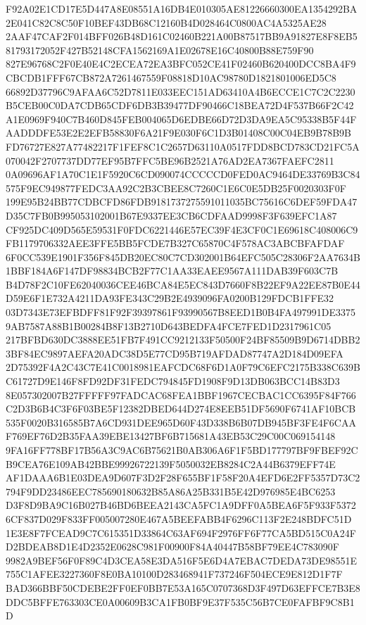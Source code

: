 \documentclass[UTF8,fontset=fandol,zihao=-4,a4paper]{ctexart}
\begin{document}
{{F92A02E1CD17E5D447A8E08551A16DB4E010305AE81226660300EA1354292BA2E041C82C8C50F10BEF43DB68C12160B4D028464C0800AC4A5325AE28
2AAF47CAF2F014BFF026B48D161C02460B221A00B87517BB9A91827E8F8EB581793172052F427B52148CFA1562169A1E02678E16C40800B88E759F90
827E96768C2F0E40E4C2ECEA72EA3BFC052CE41F02460B620400DCC8BA4F9CBCDB1FFF67CB872A7261467559F08818D10AC98780D1821801006ED5C8
66892D37796C9AFAA6C52D7811E033EEC151AD63410A4B6ECCE1C7C2C2230B5CEB00C0DA7CDB65CDF6DB3B39477DF90466C18BEA72D4F537B66F2C42
A1E0969F940C7B460D845FEB004065D6EDBE66D72D3DA9EA5C95338B5F44FAADDDFE53E2E2EFB58830F6A21F9E030F6C1D3B01408C00C04EB9B78B9B
FD76727E827A77482217F1FEF8C1C2657D63110A0517FDD8BCD783CD21FC5A070042F2707737DD77EF95B7FFC5BE96B2521A76AD2EA7367FAEFC2811
0A09696AF1A70C1E1F5920C6CD090074CCCCCD0FED0AC9464DE33769B3C84575F9EC949877FEDC3AA92C2B3CBEE8C7260C1E6C0E5DB25F0020303F0F
199E95B24BB77CDBCFD86FDB9181737275591011035BC75616C6DEF59FDA47D35C7FB0B995053102001B67E9337EE3CB6CDFAAD9998F3F639EFC1A87
CF925DC409D565E59531F0FDC6221446E57EC39F4E3CF0C1E69618C408006C9FB1179706332AEE3FFE5BB5FCDE7B327C65870C4F578AC3ABCBFAFDAF
6F0CC539E1901F356F845DB20EC80C7CD302001B64EFC505C28306F2AA7634B1BBF184A6F147DF98834BCB2F77C1AA33EAEE9567A111DAB39F603C7B
B4D78F2C10FE62040036CEE46BCA84E5EC843D7660F8B22EF9A22EE87B0E44D59E6F1E732A4211DA93FE343C29B2E4939096FA0200B129FDCB1FFE32
03D7343E73EFBDFF81F92F39397861F93990567B8EED1B0B4FA497991DE33759AB7587A88B1B00284B8F13B2710D643BEDFA4FCE7FED1D2317961C05
217BFBD630DC3888EE51FB7F491CC9212133F50500F24BF85509B9D6714DBB23BF84EC9897AEFA20ADC38D5E77CD95B719AFDAD87747A2D184D09EFA
2D75392F4A2C43C7E41C0018981EAFCDC68F6D1A0F79C6EFC2175B338C639BC61727D9E146F8FD92DF31FEDC794845FD1908F9D13DB063BCC14B83D3
8E057302007B27FFFFF97FADCAC68FEA1BBF1967CECBAC1CC6395F84F766C2D3B6B4C3F6F03BE5F12382DBED644D274E8EEB51DF5690F6741AF10BCB
535F0020B316585B7A6CD931DEE965D60F43D338B6B07DB945BF3FE4F6CAAF769EF76D2B35FAA39EBE13427BF6B715681A43EB53C29C00C069154148
9FA16FF778BF17B56A3C9AC6B75621B0AB306A6F1F5BD177797BF9FBEF92CB9CEA76E109AB42BBE99926722139F5050032EB8284C2A44B6379EFF74E
AF1DAAA6B1E03DEA9D607F3D2F28F655BF1F58F20A4EFD6E2FF5357D73C2794F9DD23486EEC785690180632B85A86A25B331B5E42D976985E4BC6253
D3F8D9BA9C16B027B46BD6BEEA2143CA5FC1A9DFF0A5BEA6F5F933F53726CF837D029F833FF005007280E467A5BEEFABB4F6296C113F2E248BDFC51D
1E3E8F7FCEAD9C7C615351D33864C63AF694F2976FF6F77CA5BD515C0A24FD2BDEAB8D1E4D2352E0628C981F00900F84A40447B58BF79EE4C783090F
9982A9BEF56F0F89C4D3CEA58E3DA516F5E6D4A7EBAC7DEDA73DE98551E755C1AFEE3227360F8E0BA10100D283468941F737246F504ECE9E812D1F7F
BAD366BBF50CDEBE2FF0EF0BB7E53A165C0707368D3F497D63EFFCE7B3E8DDC5BFFE763303CE0A00609B3CA1FB0BF9E37F535C56B7CE0FAFBF9C8B1D
}}
\end{document}
